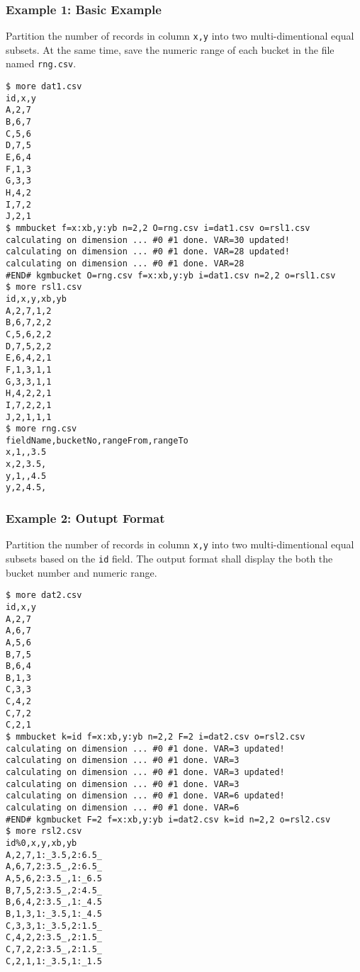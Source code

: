 \subsubsection*{Example 1: Basic Example}

Partition the number of records in column \verb|x,y| into two multi-dimentional equal subsets. At the same time, save the numeric range of each bucket in the file named \verb|rng.csv|.


\begin{Verbatim}[baselinestretch=0.7,frame=single]
$ more dat1.csv
id,x,y
A,2,7
B,6,7
C,5,6
D,7,5
E,6,4
F,1,3
G,3,3
H,4,2
I,7,2
J,2,1
$ mmbucket f=x:xb,y:yb n=2,2 O=rng.csv i=dat1.csv o=rsl1.csv
calculating on dimension ... #0 #1 done. VAR=30 updated!
calculating on dimension ... #0 #1 done. VAR=28 updated!
calculating on dimension ... #0 #1 done. VAR=28
#END# kgmbucket O=rng.csv f=x:xb,y:yb i=dat1.csv n=2,2 o=rsl1.csv
$ more rsl1.csv
id,x,y,xb,yb
A,2,7,1,2
B,6,7,2,2
C,5,6,2,2
D,7,5,2,2
E,6,4,2,1
F,1,3,1,1
G,3,3,1,1
H,4,2,2,1
I,7,2,2,1
J,2,1,1,1
$ more rng.csv
fieldName,bucketNo,rangeFrom,rangeTo
x,1,,3.5
x,2,3.5,
y,1,,4.5
y,2,4.5,
\end{Verbatim}
\subsubsection*{Example 2: Outupt Format}

Partition the number of records in column \verb|x,y| into two multi-dimentional equal subsets based on the \verb|id| field. The output format shall display the both the bucket number and numeric range.


\begin{Verbatim}[baselinestretch=0.7,frame=single]
$ more dat2.csv
id,x,y
A,2,7
A,6,7
A,5,6
B,7,5
B,6,4
B,1,3
C,3,3
C,4,2
C,7,2
C,2,1
$ mmbucket k=id f=x:xb,y:yb n=2,2 F=2 i=dat2.csv o=rsl2.csv
calculating on dimension ... #0 #1 done. VAR=3 updated!
calculating on dimension ... #0 #1 done. VAR=3
calculating on dimension ... #0 #1 done. VAR=3 updated!
calculating on dimension ... #0 #1 done. VAR=3
calculating on dimension ... #0 #1 done. VAR=6 updated!
calculating on dimension ... #0 #1 done. VAR=6
#END# kgmbucket F=2 f=x:xb,y:yb i=dat2.csv k=id n=2,2 o=rsl2.csv
$ more rsl2.csv
id%0,x,y,xb,yb
A,2,7,1:_3.5,2:6.5_
A,6,7,2:3.5_,2:6.5_
A,5,6,2:3.5_,1:_6.5
B,7,5,2:3.5_,2:4.5_
B,6,4,2:3.5_,1:_4.5
B,1,3,1:_3.5,1:_4.5
C,3,3,1:_3.5,2:1.5_
C,4,2,2:3.5_,2:1.5_
C,7,2,2:3.5_,2:1.5_
C,2,1,1:_3.5,1:_1.5
\end{Verbatim}
